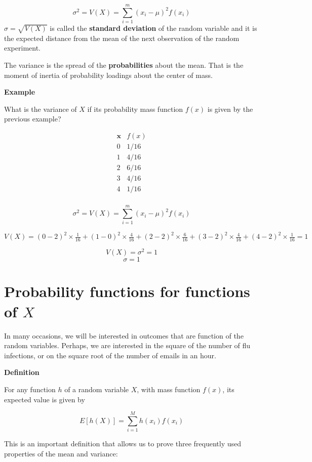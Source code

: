 \documentclass[
]{book}
\begin{document}
\[\sigma^2 = V(X)= \sum_{i=1}^m (x_i-\mu)^2 f(x_i)\]
\(\sigma=\sqrt{V(X)}\) is called the \textbf{standard deviation} of the random variable and it is the expected distance from the mean of the next observation of the random experiment.

The variance is the spread of the \textbf{probabilities} about the mean. That is the moment of inertia of probability loadings about the center of mass.

\textbf{Example}

What is the variance of \(X\) if its probability mass function \(f(x)\) is given by the previous example?

\[
\begin{array}{cc}
\mathbf{x} & f(x) \\
0 & 1/16 \\
1 & 4/16 \\
2 & 6/16 \\
3 & 4/16 \\
4 & 1/16 \\
\end{array}
\]

\[\sigma^2 =V(X)=\sum_{i=1}^m (x_i-\mu)^2 f(x_i)\]

\(V(X)=(0-2)^2 \times \frac{1}{16} + (1-0)^2 \times \frac{4}{16} + (2-2)^2 \times \frac{6}{16} + (3-2)^2 \times \frac{4}{16} + (4-2)^2 \times \frac{1}{16} =1\)

\[V(X)=\sigma^2=1\]
\[\sigma=1\]

\hypertarget{probability-functions-for-functions-of-x}{%
\section{\texorpdfstring{Probability functions for functions of \(X\)}{Probability functions for functions of X}}\label{probability-functions-for-functions-of-x}}

In many occasions, we will be interested in outcomes that are function of the random variables. Perhaps, we are interested in the square of the number of flu infections, or on the square root of the number of emails in an hour.

\textbf{Definition}

For any function \(h\) of a random variable \(X\), with mass function \(f(x)\), its expected value is given by

\[ E[h(X)]= \sum_{i=1}^M h(x_i) f(x_i) \]

This is an important definition that allows us to prove three frequently used properties of the mean and variance:
\end{document}
